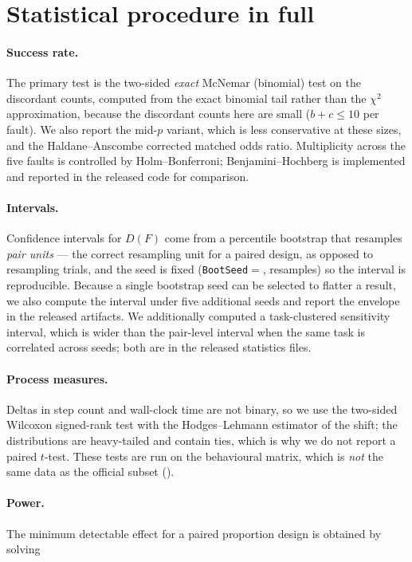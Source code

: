 \section{Statistical procedure in full}
\label{app:stats}

\paragraph{Success rate.}
The primary test is the two-sided \emph{exact} McNemar (binomial) test on the
discordant counts, computed from the exact binomial tail rather than the
$\chi^2$ approximation, because the discordant counts here are small ($b+c \le
10$ per fault). We also report the mid-$p$ variant, which is less conservative at
these sizes, and the Haldane--Anscombe corrected matched odds ratio. Multiplicity
across the five faults is controlled by Holm--Bonferroni; Benjamini--Hochberg is
implemented and reported in the released code for comparison.

\paragraph{Intervals.}
Confidence intervals for $D(F)$ come from a percentile bootstrap that resamples
\emph{pair units} --- the correct resampling unit for a paired design, as opposed
to resampling trials, and the seed is fixed (\texttt{BootSeed}$=$\BootSeed{},
\BootIters{} resamples) so the interval is reproducible. Because a single
bootstrap seed can be selected to flatter a result, we also compute the interval
under five additional seeds and report the envelope in the released artifacts. We
additionally computed a task-clustered sensitivity interval, which is wider than
the pair-level interval when the same task is correlated across seeds; both are in
the released statistics files.

\paragraph{Process measures.}
Deltas in step count and wall-clock time are not binary, so we use the two-sided
Wilcoxon signed-rank test with the Hodges--Lehmann estimator of the shift; the
distributions are heavy-tailed and contain ties, which is why we do not report a
paired $t$-test. These tests are run on the behavioural matrix, which is
\emph{not} the same data as the official subset ().

\paragraph{Power.}
The minimum detectable effect for a paired proportion design is obtained by
solving

